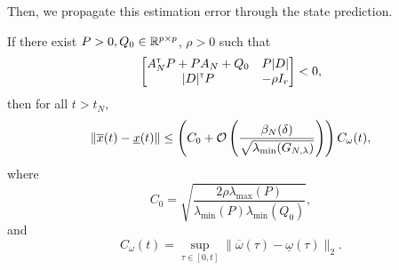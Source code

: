 \documentclass{article}
\begin{document}
Then, we propagate this estimation error through the state prediction.

\begin{lemma}
		If there exist $P>0,Q_0\in\mathbb{R}^{p\times p}$, $\rho>0$ such that
		\begin{align*}
		\begin{bmatrix}
		A_N^{\mathsf{\scriptscriptstyle T}} P + P A_N + Q_0 & P|D|  \\
		|D|^{\mathsf{\scriptscriptstyle T}} P & -\rho I_r \\
		\end{bmatrix}< 0,
		\end{align*}
		then for all $t> t_N$,
		\[\|\overline{x}(t) - \underline{x}(t)\| \leq \left(C_0 + \mathcal{O}\left({\frac{\beta_N(\delta)}{\sqrt{\lambda_{\min}(G_{N,\lambda})}}} \right)\right)C_\omega(t), \]
		where $$C_0 = \sqrt{\frac{2\rho\lambda_{\max}(P)}{\lambda_{\min}(P)\lambda_{\min}(Q_0)}},$$ and $$C_\omega(t) = \sup_{\tau\in[0,t]} \|\overline{\omega}(\tau) - \underline{\omega}(\tau)\|_2.$$
\end{lemma}
\end{document}
